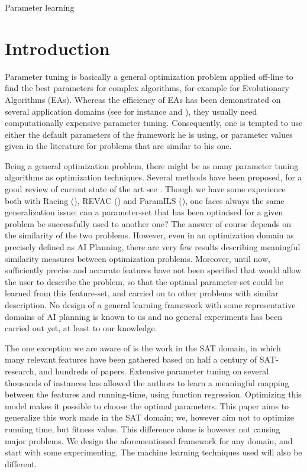 \documentclass{MYsig-alternate}
\begin{document}
 {Parameter learning}





\section{Introduction}

Parameter tuning is basically a general optimization problem applied off-line to find the best parameters for complex algorithms, for example for Evolutionary Algorithms (EAs). Whereas the efficiency of EAs has been demonstrated on several application domains (see for instance \cite{practice08} and \cite{ParameterSettingBook07}), they usually need computationally expensive parameter tuning. Consequently, one is tempted to use either the default parameters of the framework he is using, or parameter values given in the literature for problems that are similar to his one. 

Being a general optimization problem, there might be as many parameter tuning algorithms as optimization techniques. Several methods have been proposed, for a good review of current state of the art see \cite{Montero:2010}. Though we have some experience both with Racing (\cite{bibai:2009}), REVAC (\cite{Nannen07}) and ParamILS (\cite{ParamILS-JAIR}), one faces always the same generalization issue: can a parameter-set that has been optimised for a given problem be successfully used to another one? The answer of course depends on the similarity of the two problems. However, even in an optimization domain as precisely defined as AI Planning, there are very few results describing meaningful similarity measures between optimization problems. Moreover, until now, sufficiently precise and accurate features have not been specified that would allow the user to describe the problem, so that the optimal parameter-set could be learned from this feature-set, and carried on to other problems with similar description. No design of a general learning framework with some representative domains of AI planning is known to us and no general experiments has been carried out yet, at least to our knowledge.

The one exception we are aware of is the work \cite{Hutter06} in the SAT domain, in which many relevant features have been gathered based on half a century of SAT-research, and hundreds of papers. Extensive parameter tuning on several thousands of instances has allowed the authors to learn a meaningful mapping between the features and running-time, using function regression. Optimizing this model makes it possible to choose the optimal parameters. This paper aims to generalize this work made in the SAT domain; we, however aim not to optimize running time, but fitness value. This difference alone is however not causing major problems. We design the aforementioned framework for any domain, and start with some experimenting. The machine learning techniques used will also be different.
\end{document}
